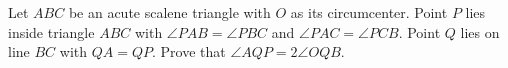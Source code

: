 Let $ABC$ be an acute scalene triangle with $O$ as its circumcenter. Point $P$ lies inside triangle $ABC$ with $\angle PAB = \angle PBC$ and $\angle PAC = \angle PCB$. Point $Q$ lies on line $BC$ with $QA = QP$. Prove that $\angle AQP = 2\angle OQB$.